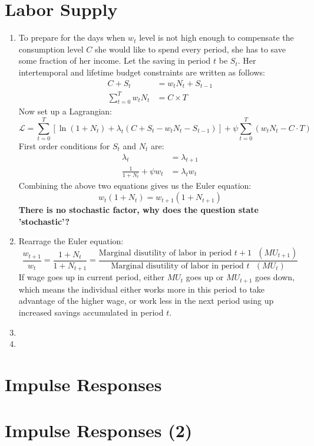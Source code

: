 \documentclass[11pt]{amsart}
\begin{document}
\section{Labor Supply}
\begin{enumerate}[label=(\alph*)]
	\item To prepare for the days when $w_t$ level is not high enough to compensate the consumption level $C$ she would like to spend every period, she has to save some fraction of her income. Let the saving in period $t$ be $S_t$. Her intertemporal and lifetime budget constraints are written as follows: 
	\begin{align*}
	C + S_t &= w_t N_t + S_{t-1} \\
	\sum_{t=0}^{T} w_t N_t & = C \times T
	\end{align*} Now set up a Lagrangian: 
	\begin{equation*}
	\mathcal{L} = \sum_{t=0}^{T}  \left[ \ln (1+ N_t) + \lambda_t \left(C + S_t - w_t N_t - S_{t-1} \right) \right] + \psi \sum_{t=0}^{T} \left( w_t N_t - C \cdot T\right)  
	\end{equation*}
    First order conditions for $S_t$ and $N_t$ are: 
    \begin{align*}
    \lambda_t &= \lambda_{t+1} \\
    \frac{1}{1+N_t} + \psi w_t &= \lambda_t w_t 
    \end{align*}
    Combining the above two equations gives us the Euler equation: 
    \begin{equation*}
    w_t (1+ N_t) = w_{t+1} (1+N_{t+1})
    \end{equation*}
    \textbf{There is no stochastic factor, why does the question state 'stochastic'?}
    \item Rearrage the Euler equation: 
    \begin{equation*}
    \frac{w_{t+1}}{w_t} = \frac{1+N_t}{1+ N_{t+1}} = \frac{\text{Marginal disutility of labor in period $t+1$ } (MU_{t+1}) }{\text{Marginal disutility of labor in period $t$ } (MU_t) }
    \end{equation*}
    If wage goes up in current period, either $MU_t$ goes up or $MU_{t+1}$ goes down, which means the individual either works more in this period to take advantage of the higher wage, or work less in the next period using up increased savings accumulated in period $t$. 
    
    \item 
    \item 
\end{enumerate}
\section{Impulse Responses}
\section{Impulse Responses (2)}
\end{document}
